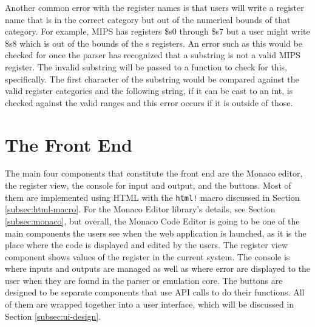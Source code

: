 \documentclass[
    paper=letter,
    parskip=half,
    fontsize=12pt,
    titlepage=firstiscover,
    toc=bibliography,
    numbers=endperiod
]{scrartcl}
\let\oldsection\section
\renewcommand{\section}{\newpage\oldsection}
\begin{document}
Another common error with the register names is that users will write a
register name that is in the correct category but out of the numerical
bounds of that category. For example, MIPS has registers \$s0 through
\$s7 but a user might write \$s8 which is out of the bounds of the s
registers. An error such as this would be checked for once the parser
has recognized that a substring is not a valid MIPS register. The
invalid substring will be passed to a function to check for this,
specifically. The first character of the substring would be compared
against the valid register categories and the following string, if it
can be cast to an int, is checked against the valid ranges and this
error occurs if it is outside of those.

\section{The Front End}
\label{sec:front-end}

The main four components that constitute the front end are the Monaco
editor, the register view, the console for input and output, and the
buttons. Most of them are implemented using HTML with the \texttt{html!}
macro discussed in Section \ref{subsec:html-macro}. For the Monaco
Editor library's details, see Section \ref{subsec:monaco}, but overall,
the Monaco Code Editor is going to be one of the main components the
users see when the web application is launched, as it is the place where
the code is displayed and edited by the users. The register view
component shows values of the register in the current system. The
console is where inputs and outputs are managed as well as where error
are displayed to the user when they are found in the parser or emulation
core. The buttons are designed to be separate components that use API
calls to do their functions. All of them are wrapped together into a
user interface, which will be discussed in Section
\ref{subsec:ui-design}.
\end{document}
